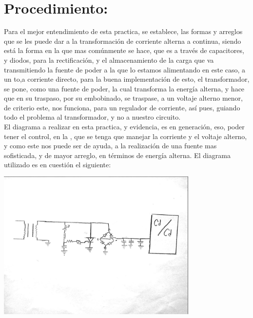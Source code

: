 \documentclass[12pt,letterpaper]{article}
\begin{document}
\section{Procedimiento:}
Para el mejor entendimiento de esta practica, se establece, las formas y arreglos que se les puede dar a la transformación de corriente alterna a continua, siendo está la forma en la que mas comúnmente se hace, que es a través de capacitores, y diodos, para la rectificación, y el almacenamiento de la carga que va transmitiendo la fuente de poder a la que lo estamos alimentando en este caso, a un to,a corriente directo, para la buena implementación de esto, el transformador, se pone, como una fuente de poder, la cual transforma la energía alterna, y hace que en su traspaso, por su embobinado, se traspase, a un voltaje alterno menor, de criterio este, nos funciona, para un regulador de corriente, así pues, guiando todo el problema al transformador, y no a nuestro circuito.\\

El diagrama a realizar en esta practica, y evidencia, es en generación, eso, poder tener el control, en la , que se tenga que manejar la corriente y el voltaje alterno, y como este nos puede ser de ayuda, a la realización de una fuente mas sofisticada, y de mayor arreglo, en términos de energía alterna. El diagrama utilizado es en cuestión el siguiente:\\

\begin{center}
\includegraphics[width=10cm]{esquema.jpeg} 
\end{center}
\end{document}
